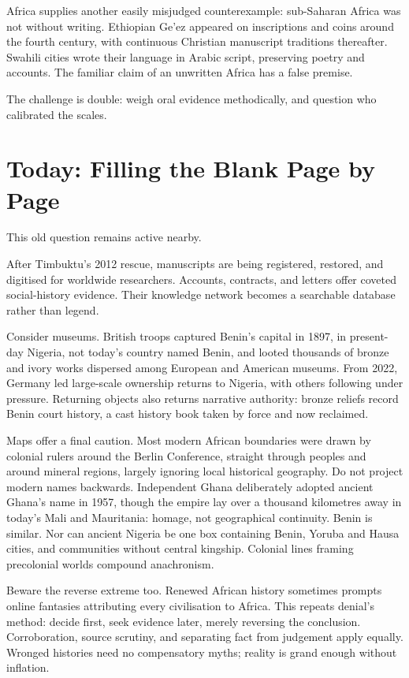 Africa supplies another easily misjudged counterexample: sub-Saharan Africa was not without writing. Ethiopian Ge'ez appeared on inscriptions and coins around the fourth century, with continuous Christian manuscript traditions thereafter. Swahili cities wrote their language in Arabic script, preserving poetry and accounts. The familiar claim of an unwritten Africa has a false premise.

The challenge is double: weigh oral evidence methodically, and question who calibrated the scales.

\section{Today: Filling the Blank Page by Page}
This old question remains active nearby.

After Timbuktu's 2012 rescue, manuscripts are being registered, restored, and digitised for worldwide researchers. Accounts, contracts, and letters offer coveted social-history evidence. Their knowledge network becomes a searchable database rather than legend.

Consider museums. British troops captured Benin's capital in 1897, in present-day Nigeria, not today's country named Benin, and looted thousands of bronze and ivory works dispersed among European and American museums. From 2022, Germany led large-scale ownership returns to Nigeria, with others following under pressure. Returning objects also returns narrative authority: bronze reliefs record Benin court history, a cast history book taken by force and now reclaimed.

Maps offer a final caution. Most modern African boundaries were drawn by colonial rulers around the Berlin Conference, straight through peoples and around mineral regions, largely ignoring local historical geography. Do not project modern names backwards. Independent Ghana deliberately adopted ancient Ghana's name in 1957, though the empire lay over a thousand kilometres away in today's Mali and Mauritania: homage, not geographical continuity. Benin is similar. Nor can ancient Nigeria be one box containing Benin, Yoruba and Hausa cities, and communities without central kingship. Colonial lines framing precolonial worlds compound anachronism.

Beware the reverse extreme too. Renewed African history sometimes prompts online fantasies attributing every civilisation to Africa. This repeats denial's method: decide first, seek evidence later, merely reversing the conclusion. Corroboration, source scrutiny, and separating fact from judgement apply equally. Wronged histories need no compensatory myths; reality is grand enough without inflation.


